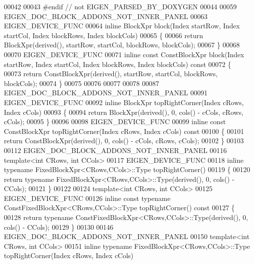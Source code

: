 \begin{DoxyCode}
00042 
00043 \textcolor{preprocessor}{#endif // not EIGEN\_PARSED\_BY\_DOXYGEN}
00044 
00059 EIGEN\_DOC\_BLOCK\_ADDONS\_NOT\_INNER\_PANEL
00063 EIGEN\_DEVICE\_FUNC
00064 \textcolor{keyword}{inline} BlockXpr block(Index startRow, Index startCol, Index blockRows, Index blockCols)
00065 \{
00066   \textcolor{keywordflow}{return} BlockXpr(derived(), startRow, startCol, blockRows, blockCols);
00067 \}
00068 
00070 EIGEN\_DEVICE\_FUNC
00071 \textcolor{keyword}{inline} \textcolor{keyword}{const} ConstBlockXpr block(Index startRow, Index startCol, Index blockRows, Index blockCols)\textcolor{keyword}{ const}
00072 \textcolor{keyword}{}\{
00073   \textcolor{keywordflow}{return} ConstBlockXpr(derived(), startRow, startCol, blockRows, blockCols);
00074 \}
00075 
00076 
00077 
00078 
00087 EIGEN\_DOC\_BLOCK\_ADDONS\_NOT\_INNER\_PANEL
00091 EIGEN\_DEVICE\_FUNC
00092 \textcolor{keyword}{inline} BlockXpr topRightCorner(Index cRows, Index cCols)
00093 \{
00094   \textcolor{keywordflow}{return} BlockXpr(derived(), 0, cols() - cCols, cRows, cCols);
00095 \}
00096 
00098 EIGEN\_DEVICE\_FUNC
00099 \textcolor{keyword}{inline} \textcolor{keyword}{const} ConstBlockXpr topRightCorner(Index cRows, Index cCols)\textcolor{keyword}{ const}
00100 \textcolor{keyword}{}\{
00101   \textcolor{keywordflow}{return} ConstBlockXpr(derived(), 0, cols() - cCols, cRows, cCols);
00102 \}
00103 
00112 EIGEN\_DOC\_BLOCK\_ADDONS\_NOT\_INNER\_PANEL
00116 \textcolor{keyword}{template}<\textcolor{keywordtype}{int} CRows, \textcolor{keywordtype}{int} CCols>
00117 EIGEN\_DEVICE\_FUNC
00118 \textcolor{keyword}{inline} \textcolor{keyword}{typename} FixedBlockXpr<CRows,CCols>::Type topRightCorner()
00119 \{
00120   \textcolor{keywordflow}{return} \textcolor{keyword}{typename} FixedBlockXpr<CRows,CCols>::Type(derived(), 0, cols() - CCols);
00121 \}
00122 
00124 \textcolor{keyword}{template}<\textcolor{keywordtype}{int} CRows, \textcolor{keywordtype}{int} CCols>
00125 EIGEN\_DEVICE\_FUNC
00126 \textcolor{keyword}{inline} \textcolor{keyword}{const} \textcolor{keyword}{typename} ConstFixedBlockXpr<CRows,CCols>::Type topRightCorner()\textcolor{keyword}{ const}
00127 \textcolor{keyword}{}\{
00128   \textcolor{keywordflow}{return} \textcolor{keyword}{typename} ConstFixedBlockXpr<CRows,CCols>::Type(derived(), 0, cols() - CCols);
00129 \}
00130 
00146 EIGEN\_DOC\_BLOCK\_ADDONS\_NOT\_INNER\_PANEL
00150 \textcolor{keyword}{template}<\textcolor{keywordtype}{int} CRows, \textcolor{keywordtype}{int} CCols>
00151 \textcolor{keyword}{inline} \textcolor{keyword}{typename} FixedBlockXpr<CRows,CCols>::Type topRightCorner(Index cRows, Index cCols)

\end{DoxyCode}
